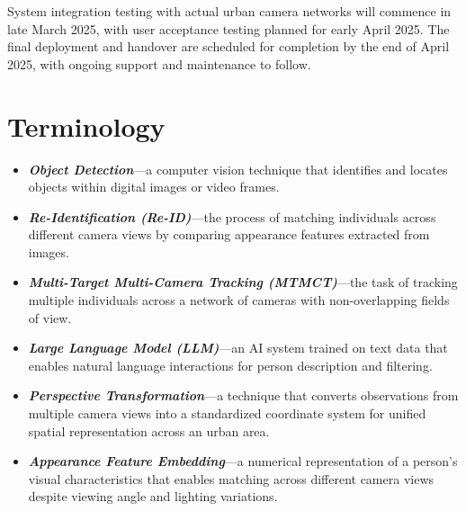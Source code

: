 System integration testing with actual urban camera networks will commence in late March 2025, with user acceptance testing planned for early April 2025.
The final deployment and handover are scheduled for completion by the end of April 2025, with ongoing support
and maintenance to follow.

\section{Terminology}
\label{section:terminology}

\begin{itemize}[leftmargin=40pt]
    \item \textbf{\textit{Object Detection}}---a computer vision technique that identifies and locates objects within digital images or video frames.
    \item \textbf{\textit{Re-Identification (Re-ID)}}---the process of matching individuals across different camera views by comparing appearance features extracted from images.
    \item \textbf{\textit{Multi-Target Multi-Camera Tracking (MTMCT)}}---the task of tracking multiple individuals across a network of cameras with non-overlapping fields of view.
    \item \textbf{\textit{Large Language Model (LLM)}}---an AI system trained on text data that enables natural language interactions for person description and filtering.
    \item \textbf{\textit{Perspective Transformation}}---a technique that converts observations from multiple camera views into a standardized coordinate system for unified spatial representation across an urban area.
    \item \textbf{\textit{Appearance Feature Embedding}}---a numerical representation of a person's visual characteristics that enables matching across different camera views despite viewing angle and lighting variations.
\end{itemize}